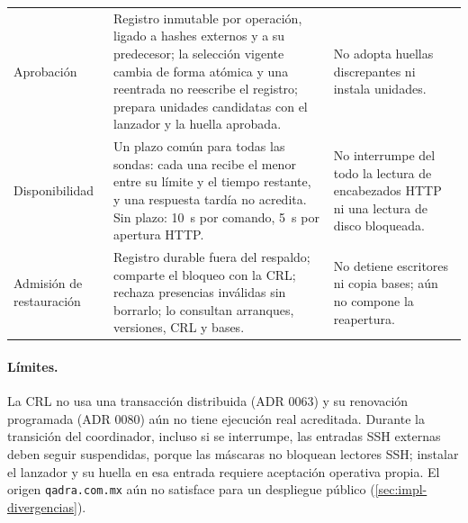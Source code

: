 \begin{longtable}{@{}L{2.75cm}>{\raggedright\arraybackslash}p{\dimexpr(\linewidth-2.75cm-4\tabcolsep)*70/100\relax}>{\raggedright\arraybackslash}p{\dimexpr(\linewidth-2.75cm-4\tabcolsep)*30/100\relax}@{}}
    Aprobación & Registro inmutable por operación, ligado a hashes externos y a su predecesor; la selección vigente cambia de forma atómica y una reentrada no reescribe el registro; prepara unidades candidatas con el lanzador y la huella aprobada. & No adopta huellas discrepantes ni instala unidades. \\
    Disponibilidad & Un plazo común para todas las sondas: cada una recibe el menor entre su límite y el tiempo restante, y una respuesta tardía no acredita. Sin plazo: 10~s por comando, 5~s por apertura HTTP. & No interrumpe del todo la lectura de encabezados HTTP ni una lectura de disco bloqueada. \\
    Admisión de restauración & Registro durable fuera del respaldo; comparte el bloqueo con la CRL; rechaza presencias inválidas sin borrarlo; lo consultan arranques, versiones, CRL y bases. & No detiene escritores ni copia bases; aún no compone la reapertura. \\
    \bottomrule
\end{longtable}
\endgroup

\paragraph{Límites.} La CRL no usa una transacción distribuida (ADR 0063) y su renovación programada (ADR 0080) aún no tiene ejecución real acreditada. Durante la transición del coordinador, incluso si se interrumpe, las entradas SSH externas deben seguir suspendidas, porque las máscaras no bloquean lectores SSH; instalar el lanzador y su huella en esa entrada requiere aceptación operativa propia. El origen \texttt{qadra.com.mx} aún no satisface  para un despliegue público (\cref{sec:impl-divergencias}).


